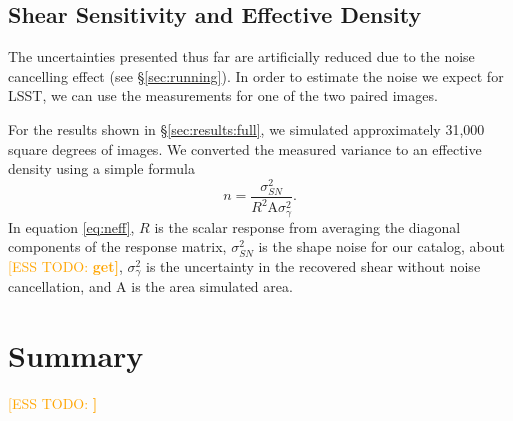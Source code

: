 \documentclass[iop, twocolappendix, appendixfloats, numberedappendix, apj]{hackemulateapj}
\newcommand{\esstodo}[1]{\textcolor{orange}{[ESS TODO: \bf #1]}}
\newcommand{\descwl}{\texttt{WeakLensingDeblending}}
\begin{document}
\subsection{Shear Sensitivity and Effective Density} \label{sec:results:effdens}

The uncertainties presented thus far are artificially reduced due to the noise
cancelling effect (see \S \ref{sec:running}).  In order to estimate the noise
we expect for LSST, we can use the measurements for one of the two paired
images.

For the results shown in \S \ref{sec:results:full}, we simulated approximately
31,000 square degrees of images.  We converted the measured variance to an
effective density using a simple formula
\begin{equation} \label{eq:neff}
    n = \frac{\sigma^2_{SN}}{R^2 \mathrm{A} \sigma^2_{\gamma}}.
\end{equation}
In equation \ref{eq:neff}, $R$ is the scalar response from averaging the
diagonal components of the response matrix, $\sigma^2_{SN}$ is the shape noise
for our catalog, about \esstodo{get}, $\sigma^2_{\gamma}$ is the uncertainty in
the recovered shear without noise cancellation, and A is the area simulated
area.

\section{Summary} \label{sec:summary}

\esstodo{}

% 

\end{document}
